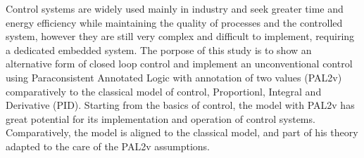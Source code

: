 Control systems are widely used mainly in industry and seek greater time and energy efficiency while maintaining the quality of processes and the controlled system,
however they are still very complex and difficult to implement, requiring a dedicated embedded system.
The porpose of this study is to show an alternative form of closed loop control and implement an unconventional control using Paraconsistent Annotated Logic with annotation of two values (PAL2v)
comparatively to the classical model of control, Proportionl, Integral and Derivative (PID).
Starting from the basics of control, the model with PAL2v has great potential for its implementation and operation of control systems.
Comparatively, the model is aligned to the classical model, and part of his theory adapted to the care of the PAL2v assumptions.
		

